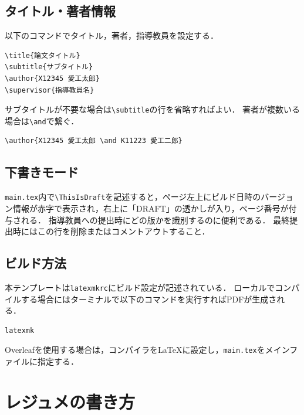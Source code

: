 \subsection{タイトル・著者情報}
\label{subsec:title}
以下のコマンドでタイトル，著者，指導教員を設定する．
\begin{lstlisting}[language={[LaTeX]TeX}, numbers=none, frame=single]
\title{論文タイトル}
\subtitle{サブタイトル}
\author{X12345 愛工太郎}
\supervisor{指導教員名}
\end{lstlisting}
サブタイトルが不要な場合は\verb|\subtitle|の行を省略すればよい．
著者が複数いる場合は\verb|\and|で繋ぐ．
\begin{lstlisting}[language={[LaTeX]TeX}, numbers=none, frame=single]
\author{X12345 愛工太郎 \and K11223 愛工二郎}
\end{lstlisting}

\subsection{下書きモード}
\label{subsec:draft}
\texttt{main.tex}内で\verb|\ThisIsDraft|を記述すると，ページ左上にビルド日時のバージョン情報が赤字で表示され，右上に「DRAFT」の透かしが入り，ページ番号が付与される．
指導教員への提出時にどの版かを識別するのに便利である．
最終提出時にはこの行を削除またはコメントアウトすること．

\subsection{ビルド方法}
\label{subsec:build}
本テンプレートは\texttt{latexmkrc}にビルド設定が記述されている．
ローカルでコンパイルする場合にはターミナルで以下のコマンドを実行すればPDFが生成される．
\begin{lstlisting}[language=bash, numbers=none, frame=single]
latexmk
\end{lstlisting}
Overleafを使用する場合は，コンパイラをLaTeXに設定し，\texttt{main.tex}をメインファイルに指定する．

\section{レジュメの書き方}
\label{sec:writing}

